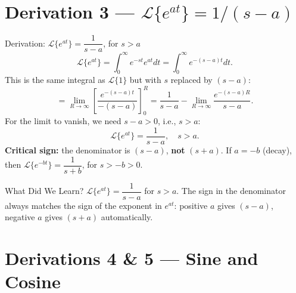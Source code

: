\documentclass[12pt,a4paper]{article}
\begin{document}
\section{Derivation 3 --- \texorpdfstring{$\mathcal{L}\{e^{at}\} = 1/(s-a)$}{L{eat}}}

\begin{infobox}{Derivation: $\mathcal{L}\{e^{at}\} = \dfrac{1}{s-a}$, for $s > a$}
\[
  \mathcal{L}\{e^{at}\} = \int_0^\infty e^{-st} e^{at} dt
  = \int_0^\infty e^{-(s-a)t} dt.
\]
This is the same integral as $\mathcal{L}\{1\}$ but with $s$ replaced by $(s-a)$:
\[
  = \lim_{R \to \infty} \left[\frac{e^{-(s-a)t}}{-(s-a)}\right]_0^R
  = \frac{1}{s-a} - \lim_{R \to \infty}\frac{e^{-(s-a)R}}{s-a}.
\]
For the limit to vanish, we need $s - a > 0$, i.e., $s > a$:
\[
  \mathcal{L}\{e^{at}\} = \boxed{\frac{1}{s-a}}, \quad s > a.
\]
\textbf{Critical sign:} the denominator is $(s - a)$, \textbf{not} $(s + a)$.
If $a = -b$ (decay), then $\mathcal{L}\{e^{-bt}\} = \dfrac{1}{s+b}$, for $s > -b > 0$.
\end{infobox}

\begin{learnbox}{What Did We Learn?}
$\mathcal{L}\{e^{at}\} = \dfrac{1}{s-a}$ for $s > a$. The sign in the denominator always
matches the sign of the exponent in $e^{at}$: positive $a$ gives $(s-a)$, negative $a$
gives $(s+a)$ automatically.
\end{learnbox}

\section{Derivations 4 \& 5 --- Sine and Cosine}
\end{document}
